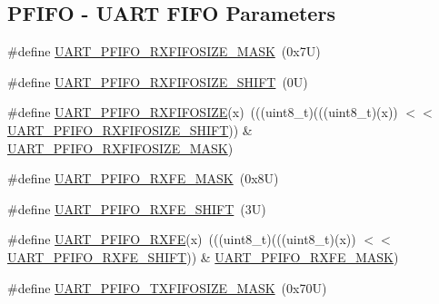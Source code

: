 \subsection*{P\+F\+I\+FO -\/ U\+A\+RT F\+I\+FO Parameters}
\begin{DoxyCompactItemize}
\item 
\#define \mbox{\hyperlink{group___u_a_r_t___register___masks_gaf6314eec454a532d9baf2eff4ea61204}{U\+A\+R\+T\+\_\+\+P\+F\+I\+F\+O\+\_\+\+R\+X\+F\+I\+F\+O\+S\+I\+Z\+E\+\_\+\+M\+A\+SK}}~(0x7\+U)
\item 
\#define \mbox{\hyperlink{group___u_a_r_t___register___masks_gae4811b6796cb32adc0f9d172e9748e75}{U\+A\+R\+T\+\_\+\+P\+F\+I\+F\+O\+\_\+\+R\+X\+F\+I\+F\+O\+S\+I\+Z\+E\+\_\+\+S\+H\+I\+FT}}~(0\+U)
\item 
\#define \mbox{\hyperlink{group___u_a_r_t___register___masks_gae66abbd658a1f8eb533f5b5eee9e5c98}{U\+A\+R\+T\+\_\+\+P\+F\+I\+F\+O\+\_\+\+R\+X\+F\+I\+F\+O\+S\+I\+ZE}}(x)~(((uint8\+\_\+t)(((uint8\+\_\+t)(x)) $<$$<$ \mbox{\hyperlink{group___u_a_r_t___register___masks_gae4811b6796cb32adc0f9d172e9748e75}{U\+A\+R\+T\+\_\+\+P\+F\+I\+F\+O\+\_\+\+R\+X\+F\+I\+F\+O\+S\+I\+Z\+E\+\_\+\+S\+H\+I\+FT}})) \& \mbox{\hyperlink{group___u_a_r_t___register___masks_gaf6314eec454a532d9baf2eff4ea61204}{U\+A\+R\+T\+\_\+\+P\+F\+I\+F\+O\+\_\+\+R\+X\+F\+I\+F\+O\+S\+I\+Z\+E\+\_\+\+M\+A\+SK}})
\item 
\#define \mbox{\hyperlink{group___u_a_r_t___register___masks_ga307298b76c15ac932486f994b3afc1b2}{U\+A\+R\+T\+\_\+\+P\+F\+I\+F\+O\+\_\+\+R\+X\+F\+E\+\_\+\+M\+A\+SK}}~(0x8\+U)
\item 
\#define \mbox{\hyperlink{group___u_a_r_t___register___masks_gae2a3c9994dc6da5a2955ac8c274bdaaf}{U\+A\+R\+T\+\_\+\+P\+F\+I\+F\+O\+\_\+\+R\+X\+F\+E\+\_\+\+S\+H\+I\+FT}}~(3\+U)
\item 
\#define \mbox{\hyperlink{group___u_a_r_t___register___masks_ga7aa339f776da1eaf995aae0829ea92b8}{U\+A\+R\+T\+\_\+\+P\+F\+I\+F\+O\+\_\+\+R\+X\+FE}}(x)~(((uint8\+\_\+t)(((uint8\+\_\+t)(x)) $<$$<$ \mbox{\hyperlink{group___u_a_r_t___register___masks_gae2a3c9994dc6da5a2955ac8c274bdaaf}{U\+A\+R\+T\+\_\+\+P\+F\+I\+F\+O\+\_\+\+R\+X\+F\+E\+\_\+\+S\+H\+I\+FT}})) \& \mbox{\hyperlink{group___u_a_r_t___register___masks_ga307298b76c15ac932486f994b3afc1b2}{U\+A\+R\+T\+\_\+\+P\+F\+I\+F\+O\+\_\+\+R\+X\+F\+E\+\_\+\+M\+A\+SK}})
\item 
\#define \mbox{\hyperlink{group___u_a_r_t___register___masks_ga61eb610888ac018061d20a755264292a}{U\+A\+R\+T\+\_\+\+P\+F\+I\+F\+O\+\_\+\+T\+X\+F\+I\+F\+O\+S\+I\+Z\+E\+\_\+\+M\+A\+SK}}~(0x70\+U)

\end{DoxyCompactItemize}
